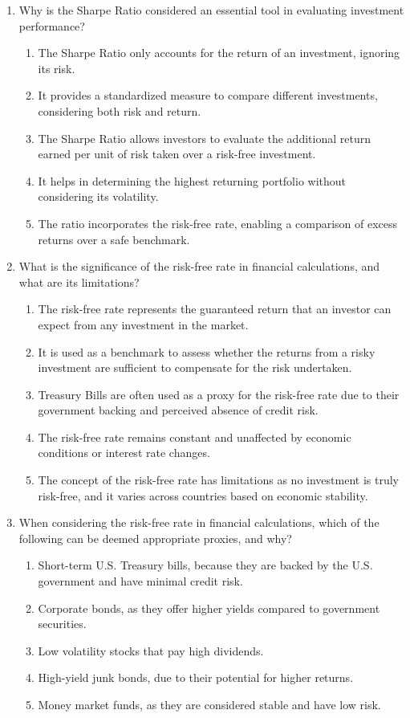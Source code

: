 \documentclass{article}
\begin{document}
\begin{enumerate}
    \item Why is the Sharpe Ratio considered an essential tool in evaluating investment performance?
    \begin{enumerate}
        \item The Sharpe Ratio only accounts for the return of an investment, ignoring its risk.
        \item It provides a standardized measure to compare different investments, considering both risk and return.
        \item The Sharpe Ratio allows investors to evaluate the additional return earned per unit of risk taken over a risk-free investment.
        \item It helps in determining the highest returning portfolio without considering its volatility.
        \item The ratio incorporates the risk-free rate, enabling a comparison of excess returns over a safe benchmark.
    \end{enumerate}
    
    \item What is the significance of the risk-free rate in financial calculations, and what are its limitations?
    \begin{enumerate}
        \item The risk-free rate represents the guaranteed return that an investor can expect from any investment in the market.
        \item It is used as a benchmark to assess whether the returns from a risky investment are sufficient to compensate for the risk undertaken.
        \item Treasury Bills are often used as a proxy for the risk-free rate due to their government backing and perceived absence of credit risk.
        \item The risk-free rate remains constant and unaffected by economic conditions or interest rate changes.
        \item The concept of the risk-free rate has limitations as no investment is truly risk-free, and it varies across countries based on economic stability.
    \end{enumerate}

    \item When considering the risk-free rate in financial calculations, which of the following can be deemed appropriate proxies, and why?
    \begin{enumerate}
        \item Short-term U.S. Treasury bills, because they are backed by the U.S. government and have minimal credit risk.
        \item Corporate bonds, as they offer higher yields compared to government securities.
        \item Low volatility stocks that pay high dividends.
        \item High-yield junk bonds, due to their potential for higher returns.
        \item Money market funds, as they are considered stable and have low risk.
    \end{enumerate}


\end{enumerate}
\end{document}
